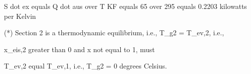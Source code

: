 S dot ex equals Q dot aus over T KF equals 65 over 295 equals 0.2203 kilowatts per Kelvin

(*) Section 2 is a thermodynamic equilibrium, i.e., T_g2 = T_ev,2, i.e.,

x_eis,2 greater than 0 and x not equal to 1, must

T_ev,2 equal T_ev,1, i.e., T_g2 = 0 degrees Celsius.